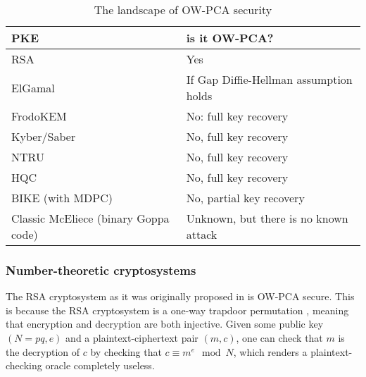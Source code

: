 \documentclass[runningheads]{llncs}
\begin{document}
\begin{table}
    \centering
    \begin{tabular}{|p{17em}|p{14em}|}
        \hline
        \centering\textbf{PKE} & \textbf{is it OW-PCA?} \\
        \hline
        RSA & Yes \cite{DBLP:conf/ima/Dent03,DBLP:journals/iacr/Shoup01}\\
        \hline
        ElGamal & If Gap Diffie-Hellman assumption holds \cite{DBLP:conf/ctrsa/AbdallaBR01,DBLP:conf/pkc/OkamotoP01}\\
        \hline
        FrodoKEM & No: full key recovery \cite{DBLP:conf/crypto/GuoJN20,DBLP:conf/eurocrypt/BaetuDHTV19} \\
        \hline
        Kyber/Saber & No, full key recovery \cite{DBLP:conf/acns/Huguenin-Dumittan20,DBLP:conf/asiacrypt/XagawaIUTH21,DBLP:conf/pqcrypto/GuoM23}\\
        \hline
        NTRU & No, full key recovery \cite{hoffstein1999reaction,DBLP:conf/crypto/JaulmesJ00,DBLP:journals/tches/UenoXTITH22} \\
        \hline
        HQC & No, full key recovery \cite{DBLP:conf/acns/Huguenin-Dumittan20,DBLP:conf/eurocrypt/BaetuDHTV19}\\
        \hline
        BIKE (with MDPC) & No, partial key recovery \cite{DBLP:conf/asiacrypt/Guo0S16} \\
        \hline
        Classic McEliece (binary Goppa code) & Unknown, but there is no known attack \cite{DBLP:journals/tches/UenoXTITH22}\\
        \hline
        
    \end{tabular}
    \caption{The landscape of OW-PCA security}\label{tbl:ow-pca-candidates}
\end{table}

\subsubsection{Number-theoretic cryptosystems} The RSA cryptosystem as it was originally proposed in \cite{DBLP:journals/cacm/RivestSA78} is OW-PCA secure. This is because the RSA cryptosystem is a one-way trapdoor permutation \cite{DBLP:conf/crypto/FujisakiOPS01}, meaning that encryption and decryption are both injective. Given some public key $(N=pq, e)$ and a plaintext-ciphertext pair $(m, c)$, one can check that $m$ is the decryption of $c$ by checking that $c \equiv m^e \mod N$, which renders a plaintext-checking oracle completely useless.
\end{document}
